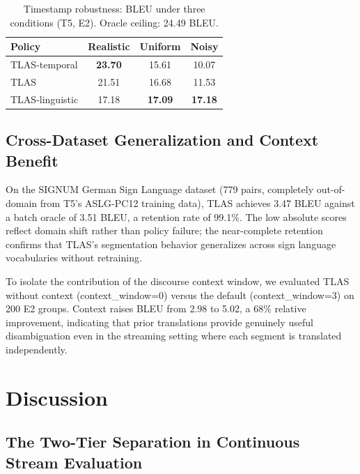 \documentclass[conference]{IEEEtran}
\begin{document}
\begin{table}[t]
\centering
\caption{Timestamp robustness: BLEU under three conditions (T5, E2). Oracle ceiling: 24.49 BLEU.}
\label{tab:robustness}
\small
\begin{tabular}{lccc}
\toprule
\textbf{Policy} & \textbf{Realistic} & \textbf{Uniform} & \textbf{Noisy} \\
\midrule
TLAS-temporal   & \textbf{23.70} & 15.61 & 10.07 \\
TLAS            & 21.51 & 16.68 & 11.53 \\
TLAS-linguistic & 17.18 & \textbf{17.09} & \textbf{17.18} \\
\bottomrule
\end{tabular}
\end{table}

\subsection{Cross-Dataset Generalization and Context Benefit}

On the SIGNUM German Sign Language dataset (779 pairs, completely out-of-domain from T5's ASLG-PC12 training data), TLAS achieves 3.47 BLEU against a batch oracle of 3.51 BLEU, a retention rate of 99.1\%. The low absolute scores reflect domain shift rather than policy failure; the near-complete retention confirms that TLAS's segmentation behavior generalizes across sign language vocabularies without retraining.

To isolate the contribution of the discourse context window, we evaluated TLAS without context (context\_window=0) versus the default (context\_window=3) on 200 E2 groups. Context raises BLEU from 2.98 to 5.02, a 68\% relative improvement, indicating that prior translations provide genuinely useful disambiguation even in the streaming setting where each segment is translated independently.

\section{Discussion}

\subsection{The Two-Tier Separation in Continuous Stream Evaluation}
\end{document}
